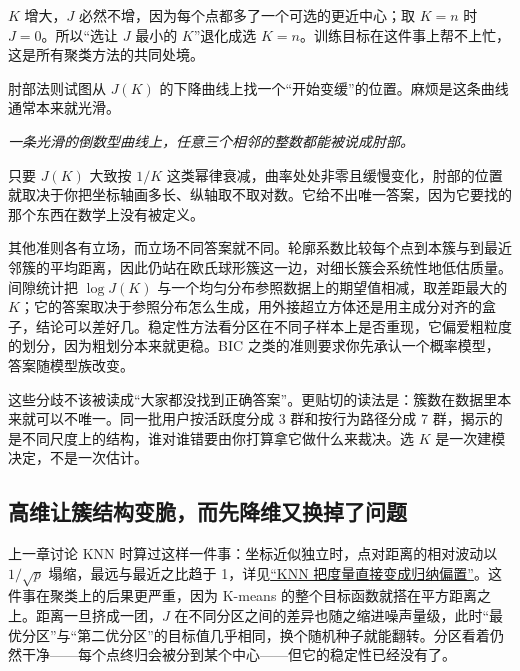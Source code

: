 \(K\) 增大，\(J\) 必然不增，因为每个点都多了一个可选的更近中心；取 \(K=n\) 时 \(J=0\)。所以``选让 \(J\) 最小的 \(K\)''退化成选 \(K=n\)。训练目标在这件事上帮不上忙，这是所有聚类方法的共同处境。

肘部法则试图从 \(J(K)\) 的下降曲线上找一个``开始变缓''的位置。麻烦是这条曲线通常本来就光滑。

\begin{center}
\end{center}

\emph{一条光滑的倒数型曲线上，任意三个相邻的整数都能被说成肘部。}

只要 \(J(K)\) 大致按 \(1/K\) 这类幂律衰减，曲率处处非零且缓慢变化，肘部的位置就取决于你把坐标轴画多长、纵轴取不取对数。它给不出唯一答案，因为它要找的那个东西在数学上没有被定义。

其他准则各有立场，而立场不同答案就不同。轮廓系数比较每个点到本簇与到最近邻簇的平均距离，因此仍站在欧氏球形簇这一边，对细长簇会系统性地低估质量。间隙统计把 \(\log J(K)\) 与一个均匀分布参照数据上的期望值相减，取差距最大的 \(K\)；它的答案取决于参照分布怎么生成，用外接超立方体还是用主成分对齐的盒子，结论可以差好几。稳定性方法看分区在不同子样本上是否重现，它偏爱粗粒度的划分，因为粗划分本来就更稳。BIC 之类的准则要求你先承认一个概率模型，答案随模型族改变。

这些分歧不该被读成``大家都没找到正确答案''。更贴切的读法是：簇数在数据里本来就可以不唯一。同一批用户按活跃度分成 3 群和按行为路径分成 7 群，揭示的是不同尺度上的结构，谁对谁错要由你打算拿它做什么来裁决。选 \(K\) 是一次建模决定，不是一次估计。

\subsection{高维让簇结构变脆，而先降维又换掉了问题}

上一章讨论 KNN 时算过这样一件事：坐标近似独立时，点对距离的相对波动以 \(1/\sqrt p\) 塌缩，最远与最近之比趋于 1，详见\hyperref[sec:13-Machine-Learning/03-Trees-Ensembles-and-Neighbors/03]{``KNN 把度量直接变成归纳偏置''}。这件事在聚类上的后果更严重，因为 K-means 的整个目标函数就搭在平方距离之上。距离一旦挤成一团，\(J\) 在不同分区之间的差异也随之缩进噪声量级，此时``最优分区''与``第二优分区''的目标值几乎相同，换个随机种子就能翻转。分区看着仍然干净——每个点终归会被分到某个中心——但它的稳定性已经没有了。

